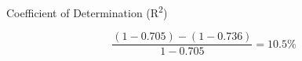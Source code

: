 \begin{frame}{Coefficient of Determination (R\textsuperscript{2})}
	\begin{center}		
		
	\end{center}
	\large
	$$\frac{(1-0.705)  -  (1-0.736)}{ 1-0.705}   = 10.5\%$$
\end{frame}

